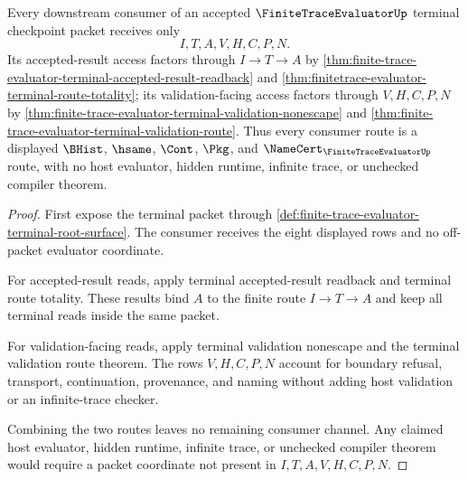 \begin{theorem}
\label{thm:finite-trace-evaluator-terminal-consumer-nonescape}
Every downstream consumer of an accepted $\FiniteTraceEvaluatorUp$ terminal checkpoint packet receives only
$$
I,T,A,V,H,C,P,N.
$$
Its accepted-result access factors through $I \to T \to A$ by \autoref{thm:finite-trace-evaluator-terminal-accepted-result-readback} and \autoref{thm:finitetrace-evaluator-terminal-route-totality}; its validation-facing access factors through $V,H,C,P,N$ by \autoref{thm:finite-trace-evaluator-terminal-validation-nonescape} and \autoref{thm:finite-trace-evaluator-terminal-validation-route}. Thus every consumer route is a displayed $\BHist$, $\hsame$, $\Cont$, $\Pkg$, and $\NameCert_{\FiniteTraceEvaluatorUp}$ route, with no host evaluator, hidden runtime, infinite trace, or unchecked compiler theorem.
\end{theorem}
\begin{proof}
First expose the terminal packet through \autoref{def:finite-trace-evaluator-terminal-root-surface}. The consumer receives the eight displayed rows and no off-packet evaluator coordinate.

For accepted-result reads, apply terminal accepted-result readback and terminal route totality. These results bind $A$ to the finite route $I \to T \to A$ and keep all terminal reads inside the same packet.

For validation-facing reads, apply terminal validation nonescape and the terminal validation route theorem. The rows $V,H,C,P,N$ account for boundary refusal, transport, continuation, provenance, and naming without adding host validation or an infinite-trace checker.

Combining the two routes leaves no remaining consumer channel. Any claimed host evaluator, hidden runtime, infinite trace, or unchecked compiler theorem would require a packet coordinate not present in $I,T,A,V,H,C,P,N$.
\end{proof}
